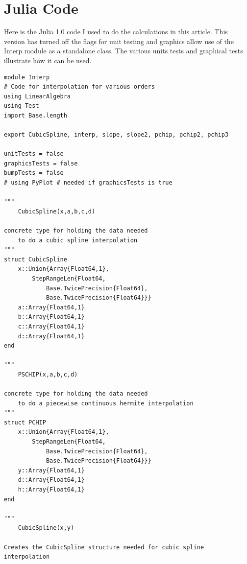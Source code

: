 \documentclass{scrartcl}
\begin{document}
\section{Julia Code}
Here is the Julia 1.0 code I used to do the calculations in this
article. This version has turned off the flags for unit testing
and graphics allow use of the Interp module as a standalone class.
The various units tests and graphical tests illustrate how it
can be used.
\begin{lstlisting}
module Interp
# Code for interpolation for various orders
using LinearAlgebra
using Test
import Base.length

export CubicSpline, interp, slope, slope2, pchip, pchip2, pchip3

unitTests = false
graphicsTests = false
bumpTests = false
# using PyPlot # needed if graphicsTests is true

"""
    CubicSpline(x,a,b,c,d)

concrete type for holding the data needed
    to do a cubic spline interpolation
"""
struct CubicSpline
    x::Union{Array{Float64,1},
        StepRangeLen{Float64,
            Base.TwicePrecision{Float64},
            Base.TwicePrecision{Float64}}}
    a::Array{Float64,1}
    b::Array{Float64,1}
    c::Array{Float64,1}
    d::Array{Float64,1}
end

"""
    PSCHIP(x,a,b,c,d)

concrete type for holding the data needed
    to do a piecewise continuous hermite interpolation
"""
struct PCHIP
    x::Union{Array{Float64,1},
        StepRangeLen{Float64,
            Base.TwicePrecision{Float64},
            Base.TwicePrecision{Float64}}}
    y::Array{Float64,1}
    d::Array{Float64,1}
    h::Array{Float64,1}
end

"""
    CubicSpline(x,y)

Creates the CubicSpline structure needed for cubic spline
interpolation


\end{lstlisting}
\end{document}
